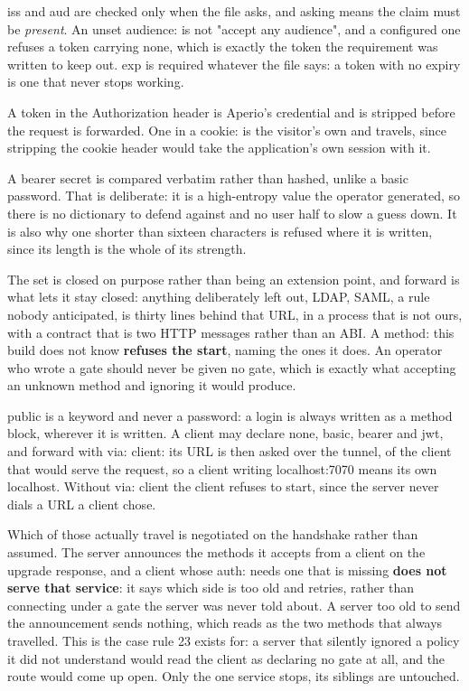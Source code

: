 \documentclass[11pt,a4paper,oneside]{book}
\newcommand{\aperiobreakableunderscore}{\textunderscore\allowbreak}
\newcommand{\aperiocodebreaks}{\XeTeXinterchartokenstate=1 }
\newcommand{\aperiocodebreaks}{}
\DeclareRobustCommand{\code}[1]{{\ttfamily\small\aperiocodebreaks
  \let\_\aperiobreakableunderscore#1}}
\begin{document}
\code{iss} and \code{aud} are checked only when the file asks, and asking
means the claim must be \emph{present}. An unset \code{audience:} is not
"accept any audience", and a configured one refuses a token carrying
none, which is exactly the token the requirement was written to keep out.
\code{exp} is required whatever the file says: a token with no expiry is
one that never stops working.

A token in the \code{Authorization} header is Aperio's credential and is
stripped before the request is forwarded. One in a \code{cookie:} is the
visitor's own and travels, since stripping the cookie header would take
the application's own session with it.

A \code{bearer} secret is compared verbatim rather than hashed, unlike a
\code{basic} password. That is deliberate: it is a high-entropy value the
operator generated, so there is no dictionary to defend against and no
user half to slow a guess down. It is also why one shorter than sixteen
characters is refused where it is written, since its length is the whole
of its strength.

The set is closed on purpose rather than being an extension point, and
\code{forward} is what lets it stay closed: anything deliberately left
out, LDAP, SAML, a rule nobody anticipated, is thirty lines behind that
URL, in a process that is not ours, with a contract that is two HTTP
messages rather than an ABI. A \code{method:} this build does not know
\textbf{refuses the start},
naming the ones it does. An operator who wrote a gate should never be
given no gate, which is exactly what accepting an unknown method and
ignoring it would produce.

\code{public} is a keyword and never a password: a login is always written
as a method block, wherever it is written. A client may declare \code{none}, \code{basic}, \code{bearer} and
\code{jwt}, and \code{forward} with \code{via: client}: its URL is then
asked over the tunnel, of the client that would serve the request, so a
client writing \code{localhost:7070} means its own localhost. Without
\code{via: client} the client refuses to start, since the server never
dials a URL a client chose.

Which of those actually travel is negotiated on the handshake rather
than assumed. The server announces the methods it accepts from a client
on the upgrade response, and a client whose \code{auth:} needs one that
is missing \textbf{does not serve that service}: it says which side is
too old and retries, rather than connecting under a gate the server was
never told about. A server too old to send the announcement sends
nothing, which reads as the two methods that always travelled. This is
the case rule 23 exists for: a server that silently ignored a policy it
did not understand would read the client as declaring no gate at all,
and the route would come up open. Only the one service stops, its
siblings are untouched.
\end{document}
